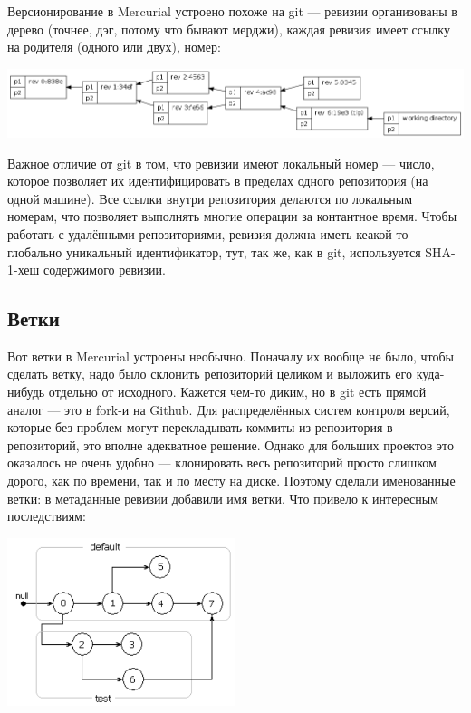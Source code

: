 \documentclass{../../text-style}
\begin{document}
Версионирование в Mercurial устроено похоже на git --- ревизии организованы в дерево (точнее, дэг, потому что бывают мерджи), каждая ревизия имеет ссылку на родителя (одного или двух), номер:

\begin{center}
    \includegraphics[width=\textwidth]{mercurialRevisions.png}
\end{center}

Важное отличие от git в том, что ревизии имеют локальный номер --- число, которое позволяет их идентифицировать в пределах одного репозитория (на одной машине). Все ссылки внутри репозитория делаются по локальным номерам, что позволяет выполнять многие операции за контантное время. Чтобы работать с удалёнными репозиториями, ревизия должна иметь кеакой-то глобально уникальный идентификатор, тут, так же, как в git, используется SHA-1-хеш содержимого ревизии.

\subsection{Ветки}

Вот ветки в Mercurial устроены необычно. Поначалу их вообще не было, чтобы сделать ветку, надо было склонить репозиторий целиком и выложить его куда-нибудь отдельно от исходного. Кажется чем-то диким, но в git есть прямой аналог --- это в fork-и на Github. Для распределённых систем контроля версий, которые без проблем могут перекладывать коммиты из репозитория в репозиторий, это вполне адекватное решение. Однако для больших проектов это оказалось не очень удобно --- клонировать весь репозиторий просто слишком дорого, как по времени, так и по месту на диске. Поэтому сделали именованные ветки: в метаданные ревизии добавили имя ветки. Что привело к интересным последствиям:

\begin{center}
    \includegraphics[width=0.5\textwidth]{mercurialBranches.png}
\end{center}
\end{document}
